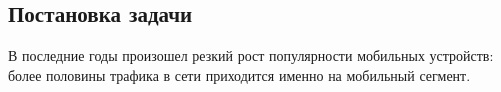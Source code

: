 \subsection{Постановка задачи}
В последние годы произошел резкий рост популярности мобильных устройств: более половины трафика в сети приходится именно на мобильный сегмент\cite{bibid}.
	
%
%
%
%
%

